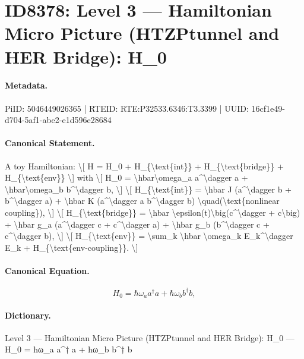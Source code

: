 \section*{ID8378: Level 3 — Hamiltonian Micro Picture (HTZPtunnel and HER Bridge): H\_0}
\paragraph{Metadata.}
PiID: 5046449026365 | RTEID: RTE:P32533.6346:T3.3399 | UUID: 16cf1e49-d704-5af1-abe2-e1d596e28684

\paragraph{Canonical Statement.}
A toy Hamiltonian: \textbackslash{}[ H = H\_0 + H\_\{\textbackslash{}text\{int\}\} + H\_\{\textbackslash{}text\{bridge\}\} + H\_\{\textbackslash{}text\{env\}\} \textbackslash{}] with \textbackslash{}[ H\_0 = \textbackslash{}hbar\textbackslash{}omega\_a a\textasciicircum{}\textbackslash{}dagger a + \textbackslash{}hbar\textbackslash{}omega\_b b\textasciicircum{}\textbackslash{}dagger b, \textbackslash{}] \textbackslash{}[ H\_\{\textbackslash{}text\{int\}\} = \textbackslash{}hbar J (a\textasciicircum{}\textbackslash{}dagger b + b\textasciicircum{}\textbackslash{}dagger a) + \textbackslash{}hbar K (a\textasciicircum{}\textbackslash{}dagger a b\textasciicircum{}\textbackslash{}dagger b) \textbackslash{}quad(\textbackslash{}text\{nonlinear coupling\}), \textbackslash{}] \textbackslash{}[ H\_\{\textbackslash{}text\{bridge\}\} = \textbackslash{}hbar \textbackslash{}epsilon(t)\textbackslash{}big(c\textasciicircum{}\textbackslash{}dagger + c\textbackslash{}big) + \textbackslash{}hbar g\_a (a\textasciicircum{}\textbackslash{}dagger c + c\textasciicircum{}\textbackslash{}dagger a) + \textbackslash{}hbar g\_b (b\textasciicircum{}\textbackslash{}dagger c + c\textasciicircum{}\textbackslash{}dagger b), \textbackslash{}] \textbackslash{}[ H\_\{\textbackslash{}text\{env\}\} = \textbackslash{}sum\_k \textbackslash{}hbar \textbackslash{}omega\_k E\_k\textasciicircum{}\textbackslash{}dagger E\_k + H\_\{\textbackslash{}text\{env-coupling\}\}. \textbackslash{}]

\paragraph{Canonical Equation.}
\[
H_0 = \hbar\omega_a a^\dagger a + \hbar\omega_b b^\dagger b,
\]

\paragraph{Dictionary.}
Level 3 — Hamiltonian Micro Picture (HTZPtunnel and HER Bridge): H\_0 — H\_0 = ħω\_a a\textasciicircum{}† a + ħω\_b b\textasciicircum{}† b

